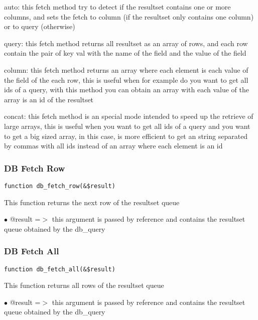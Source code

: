 \documentclass[a4paper]{article}
\begin{document}
auto: this fetch method try to detect if the resultset contains one or more columns, and
sets the fetch to column (if the resultset only contains one column) or to query (otherwise)

query: this fetch method returns all resultset as an array of rows, and each row contain the
pair of key val with the name of the field and the value of the field

column: this fetch method returns an array where each element is each value of the field of
the each row, this is useful when for example do you want to get all ids of a query, with
this method you can obtain an array with each value of the array is an id of the resultset

concat: this fetch method is an special mode intended to speed up the retrieve of large
arrays, this is useful when you want to get all ids of a query and you want to get a big
sized array, in this case, is more efficient to get an string separated by commas with all
ids instead of an array where each element is an id

\hypertarget{toc88}{}
\subsubsection{DB Fetch Row}

\begin{lstlisting}
function db_fetch_row(&$result)
\end{lstlisting}

This function returns the next row of the resultset queue

\begin{compactitem}
\item[\color{myblue}$\bullet$] @result =$>$ this argument is passed by reference and contains the resultset queue
           obtained by the db\_query
\end{compactitem}

\hypertarget{toc89}{}
\subsubsection{DB Fetch All}

\begin{lstlisting}
function db_fetch_all(&$result)
\end{lstlisting}

This function returns all rows of the resultset queue

\begin{compactitem}
\item[\color{myblue}$\bullet$] @result =$>$ this argument is passed by reference and contains the resultset queue
           obtained by the db\_query
\end{compactitem}
\end{document}
